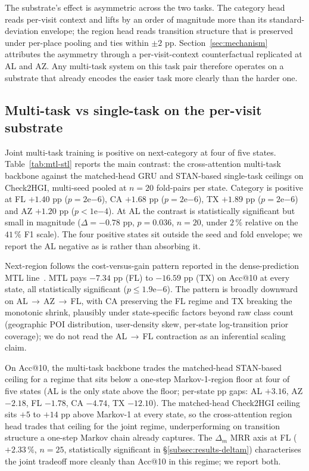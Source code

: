 

The substrate's effect is asymmetric across the two tasks. The category head reads per-visit context and lifts by an order of magnitude more than its standard-deviation envelope; the region head reads transition structure that is preserved under per-place pooling and ties within $\pm 2$ pp. Section~\ref{sec:mechanism} attributes the asymmetry through a per-visit-context counterfactual replicated at AL and AZ. Any multi-task system on this task pair therefore operates on a substrate that already encodes the easier task more clearly than the harder one.

\subsection{Multi-task vs single-task on the per-visit substrate}
\label{subsec:results-mtl-stl}

Joint multi-task training is positive on next-category at four of five states. Table~\ref{tab:mtl-stl} reports the main contrast: the cross-attention multi-task backbone against the matched-head GRU and STAN-based single-task ceilings on Check2HGI, multi-seed pooled at $n=20$ fold-pairs per state. Category is positive at FL $+1.40$ pp ($p=2\mathrm{e}{-6}$), CA $+1.68$ pp ($p=2\mathrm{e}{-6}$), TX $+1.89$ pp ($p=2\mathrm{e}{-6}$) and AZ $+1.20$ pp ($p<1\mathrm{e}{-4}$). At AL the contrast is statistically significant but small in magnitude ($\Delta=-0.78$ pp, $p=0.036$, $n=20$, under $2\,\%$ relative on the $41\,\%$ F1 scale). The four positive states sit outside the seed and fold envelope; we report the AL negative as is rather than absorbing it.



Next-region follows the cost-versus-gain pattern reported in the dense-prediction MTL line~\cite{vandenhende2022mtl}. MTL pays $-7.34$ pp (FL) to $-16.59$ pp (TX) on Acc@10 at every state, all statistically significant ($p\leq 1.9\mathrm{e}{-6}$). The pattern is broadly downward on AL\,$\to$\,AZ\,$\to$\,FL, with CA preserving the FL regime and TX breaking the monotonic shrink, plausibly under state-specific factors beyond raw class count (geographic POI distribution, user-density skew, per-state log-transition prior coverage); we do not read the AL\,$\to$\,FL contraction as an inferential scaling claim.

On Acc@10, the multi-task backbone trades the matched-head STAN-based ceiling for a regime that sits below a one-step Markov-1-region floor at four of five states (AL is the only state above the floor; per-state pp gaps: AL $+3.16$, AZ $-2.18$, FL $-1.78$, CA $-4.74$, TX $-12.10$). The matched-head Check2HGI ceiling sits $+5$ to $+14$ pp above Markov-1 at every state, so the cross-attention region head trades that ceiling for the joint regime, underperforming on transition structure a one-step Markov chain already captures. The $\Delta_m$ MRR axis at FL ($+2.33\,\%$, $n=25$, statistically significant in \S\ref{subsec:results-deltam}) characterises the joint tradeoff more cleanly than Acc@10 in this regime; we report both.


